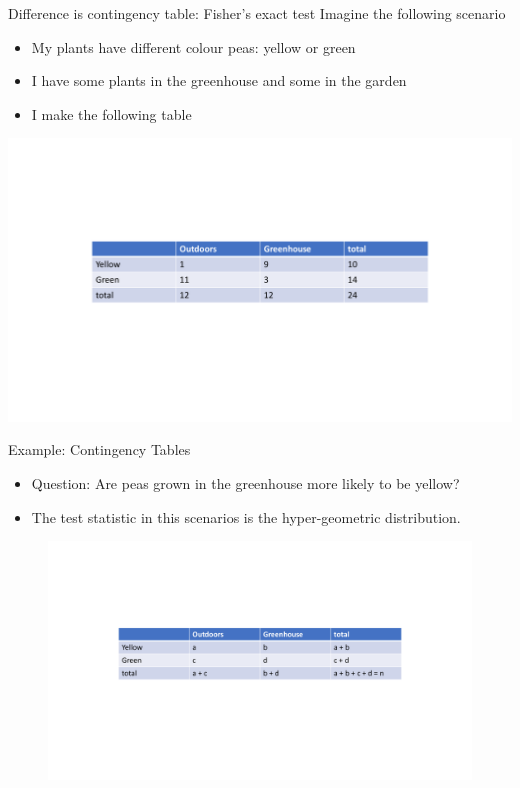 \documentclass{bredelebeamer}
\begin{document}
\begin{frame}{Difference is contingency table: Fisher's exact test}
Imagine the following scenario
\begin{block}
	
	\begin{itemize}
		\item My plants have different colour peas: yellow or green
		\item I have some plants in the greenhouse and some in the garden
		\item I make the following table
	\end{itemize}
	
\end{block}

\includegraphics[width=1\textwidth]{contigencytable}

\end{frame}

\begin{frame}


\begin{block}{Example: Contingency Tables}
	
	\begin{itemize}
		\item Question: Are peas grown in the greenhouse more likely to be yellow?
		\item The test statistic in this scenarios is the hyper-geometric distribution.
	\end{itemize}
\end{block}

\begin{figure}
\includegraphics[width=1\textwidth]{contigencytable2}
\end{figure}

\end{frame}
\end{document}
